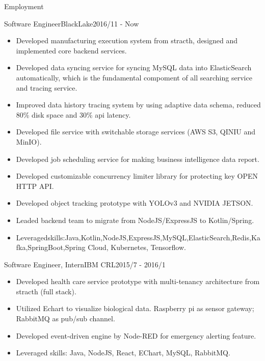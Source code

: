 \documentclass[]{minhuacv}
\begin{document}
	\makeheader
	
	\begin{cvsection}{Employment}
		\begin{cvsubsection}{Software Engineer}{BlackLake}{2016/11 - Now}
			\begin{itemize}
				\item Developed manufacturing execution system from stracth, designed and implemented core backend services.
				\item Developed data syncing service for syncing MySQL data into ElasticSearch automatically, which is the fundamental compoment of all searching service and tracing service.
				\item Improved data history tracing system by using adaptive data schema, reduced 80\% disk space and 30\% api latency.
				\item Developed file service with switchable storage services (AWS S3, QINIU and MinIO).
				\item Developed job scheduling service for making business intelligence data report.
				\item Developed customizable concurrency limiter library for protecting key OPEN HTTP API.
				\item Developed object tracking prototype with YOLOv3 and NVIDIA JETSON.
				\item Leaded backend team to migrate from NodeJS/ExpressJS to Kotlin/Spring.
				\item Leveragedskills:Java,Kotlin,NodeJS,ExpressJS,MySQL,ElasticSearch,Redis,Kafka,SpringBoot,Spring Cloud, Kubernetes, Tensorflow.
			\end{itemize}
		\end{cvsubsection}
		
		\begin{cvsubsection}{Software Engineer, Intern}{IBM CRL}{2015/7 - 2016/1}	
			\begin{itemize}
				\item Developed health care service prototype with multi-tenancy architecture from stracth (full stack).
				\item Utilized Echart to visualize biological data. Raspberry pi as sensor gateway; RabbitMQ as pub/sub channel.
				\item Developed event-driven engine by Node-RED for emergency alerting feature.
				\item Leveraged skills: Java, NodeJS, React, EChart, MySQL, RabbitMQ.
			\end{itemize}
		\end{cvsubsection}
		

\end{cvsection}
\end{document}
